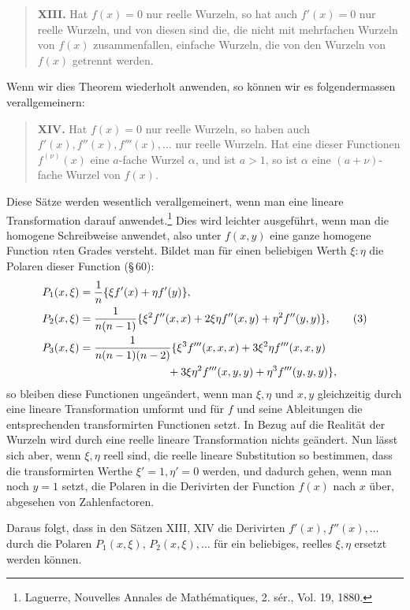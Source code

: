 \documentclass[11pt]{article}
\begin{document}
\begin{quote}
\textbf{XIII.} Hat $f(x)=0$ nur reelle Wurzeln, so hat auch $f'(x)=0$ nur reelle Wurzeln, und von diesen sind die, die nicht mit mehrfachen Wurzeln von $f(x)$ zusammenfallen, einfache Wurzeln, die von den Wurzeln von $f(x)$ getrennt werden.
\end{quote}

Wenn wir dies Theorem wiederholt anwenden, so können wir es folgendermassen verallgemeinern:

\begin{quote}
\textbf{XIV.} Hat $f(x)=0$ nur reelle Wurzeln, so haben auch $f'(x),f''(x),f'''(x),\ldots$ nur reelle Wurzeln. Hat eine dieser Functionen $f^{(\nu)}(x)$ eine $a$-fache Wurzel $\alpha$, und ist $a>1$, so ist $\alpha$ eine $(a+\nu)$-fache Wurzel von $f(x)$.
\end{quote}

Diese Sätze werden wesentlich verallgemeinert, wenn man eine lineare Transformation darauf anwendet.\footnote{Laguerre, Nouvelles Annales de Mathématiques, 2. sér., Vol. 19, 1880.} Dies wird leichter ausgeführt, wenn man die homogene Schreibweise anwendet, also unter $f(x,y)$ eine ganze homogene Function $n$ten Grades versteht. Bildet man für einen beliebigen Werth $\xi:\eta$ die Polaren dieser Function (\S\,60):
\begin{align}
P_1(x,\xi)&=\frac1n\{\xi f'(x)+\eta f'(y)\},\notag\\
P_2(x,\xi)&=\frac{1}{n(n-1)}\{\xi^2f''(x,x)+2\xi\eta f''(x,y)+\eta^2 f''(y,y)\},\tag{3}\\
P_3(x,\xi)&=\frac{1}{n(n-1)(n-2)}
\{\xi^3 f'''(x,x,x)+3\xi^2\eta f'''(x,x,y)\notag\\
&\hspace{8em}+3\xi\eta^2 f'''(x,y,y)+\eta^3 f'''(y,y,y)\},
\notag
\end{align}
so bleiben diese Functionen ungeändert, wenn man $\xi,\eta$ und $x,y$ gleichzeitig durch eine lineare Transformation umformt und für $f$ und seine Ableitungen die entsprechenden transformirten Functionen setzt. In Bezug auf die Realität der Wurzeln wird durch eine reelle lineare Transformation nichts geändert. Nun lässt sich aber, wenn $\xi,\eta$ reell sind, die reelle lineare Substitution so bestimmen, dass die transformirten Werthe $\xi'=1,\eta'=0$ werden, und dadurch gehen, wenn man noch $y=1$ setzt, die Polaren in die Derivirten der Function $f(x)$ nach $x$ über, abgesehen von Zahlenfactoren.

Daraus folgt, dass in den Sätzen XIII, XIV die Derivirten $f'(x),f''(x),\ldots$ durch die Polaren $P_1(x,\xi)$, $P_2(x,\xi),\ldots$ für ein beliebiges, reelles $\xi,\eta$ ersetzt werden können.
\end{document}
